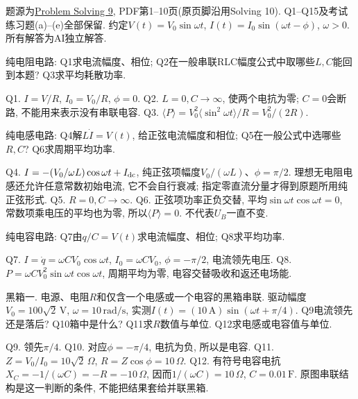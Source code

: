 题源为\href{https://ocw.mit.edu/courses/8-02-physics-ii-electricity-and-magnetism-spring-2007/resources/solving09/}{Problem Solving 9}, PDF第1--10页(原页脚沿用Solving 10). Q1--Q15及考试练习题(a)--(e)全部保留. 约定$V(t)=V_0\sin\omega t$, $I(t)=I_0\sin(\omega t-\phi)$, $\omega>0$. 所有解答为AI独立解答.

\begin{exercise}
纯电阻电路: Q1求电流幅度、相位; Q2在一般串联RLC幅度公式中取哪些$L,C$能回到本题? Q3求平均耗散功率.
\end{exercise}
\begin{solution}
Q1. $I=V/R$, $I_0=V_0/R$, $\phi=0$.
Q2. $L=0,C\to\infty$, 使两个电抗为零; $C=0$会断路, 不能用来表示没有串联电容.
Q3. $\langle P\rangle=V_0^2\langle\sin^2\omega t\rangle/R=V_0^2/(2R)$.
\end{solution}

\begin{exercise}
纯电感电路: Q4解$L\dot I=V(t)$, 给正弦电流幅度和相位; Q5在一般公式中选哪些$R,C$? Q6求周期平均功率.
\end{exercise}
\begin{solution}
Q4. $I=-(V_0/\omega L)\cos\omega t+I_{\rm dc}$, 纯正弦项幅度$V_0/(\omega L)$、$\phi=\pi/2$. 理想无电阻电感还允许任意常数初始电流, 它不会自行衰减; 指定零直流分量才得到原题所用纯正弦形式.
Q5. $R=0,C\to\infty$.
Q6. 正弦项功率正负交替, 平均$\sin\omega t\cos\omega t=0$, 常数项乘电压的平均也为零, 所以$\langle P\rangle=0$. 不代表$U_B$一直不变.
\end{solution}

\begin{exercise}
纯电容电路: Q7由$q/C=V(t)$求电流幅度、相位; Q8求平均功率.
\end{exercise}
\begin{solution}
Q7. $I=\dot q=\omega CV_0\cos\omega t$, $I_0=\omega CV_0$, $\phi=-\pi/2$, 电流领先电压.
Q8. $P=\omega CV_0^2\sin\omega t\cos\omega t$, 周期平均为零, 电容交替吸收和返还电场能.
\end{solution}

\begin{exercise}
黑箱一. 电源、电阻$R$和仅含一个电感或一个电容的黑箱串联. 驱动幅度$V_0=100\sqrt2\,\mathrm V$, $\omega=10\,\mathrm{rad/s}$, 实测$I(t)=(10\,\mathrm A)\sin(\omega t+\pi/4)$.
Q9电流领先还是落后? Q10箱中是什么? Q11求$R$数值与单位. Q12求电感或电容值与单位.
\end{exercise}
\begin{solution}
Q9. 领先$\pi/4$. Q10. 对应$\phi=-\pi/4$, 电抗为负, 所以是电容.
Q11. $Z=V_0/I_0=10\sqrt2\,\Omega$, $R=Z\cos\phi=10\,\Omega$.
Q12. 有符号电容电抗$X_C=-1/(\omega C)=-R=-10\,\Omega$, 因而$1/(\omega C)=10\,\Omega$, $C=0.01\,\mathrm F$. 原图串联结构是这一判断的条件, 不能把结果套给并联黑箱.
\end{solution}

